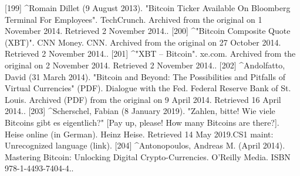 [199]
^Romain Dillet (9 August 2013). "Bitcoin Ticker Available On Bloomberg Terminal For Employees". TechCrunch. Archived from the original on 1 November 2014. Retrieved 2 November 2014..
[200]
^"Bitcoin Composite Quote (XBT)". CNN Money. CNN. Archived from the original on 27 October 2014. Retrieved 2 November 2014..
[201]
^"XBT – Bitcoin". xe.com. Archived from the original on 2 November 2014. Retrieved 2 November 2014..
[202]
^Andolfatto, David (31 March 2014). "Bitcoin and Beyond: The Possibilities and Pitfalls of Virtual Currencies" (PDF). Dialogue with the Fed. Federal Reserve Bank of St. Louis. Archived (PDF) from the original on 9 April 2014. Retrieved 16 April 2014..
[203]
^Scherschel, Fabian (8 January 2019). "Zahlen, bitte! Wie viele Bitcoins gibt es eigentlich?" [Pay up, please! How many Bitcoins are there?]. Heise online (in German). Heinz Heise. Retrieved 14 May 2019.CS1 maint: Unrecognized language (link).
[204]
^Antonopoulos, Andreas M. (April 2014). Mastering Bitcoin: Unlocking Digital Crypto-Currencies. O'Reilly Media. ISBN 978-1-4493-7404-4..